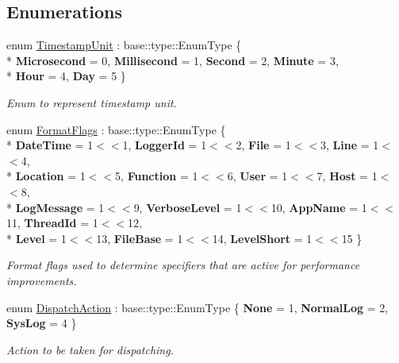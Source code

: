 \subsection*{Enumerations}
\begin{DoxyCompactItemize}
\item 
enum \hyperlink{namespaceel_1_1base_a1b886858c6409097395b24b1bdf03c39}{Timestamp\+Unit} \+: base\+::type\+::\+Enum\+Type \{ \\*
{\bfseries Microsecond} = 0, 
{\bfseries Millisecond} = 1, 
{\bfseries Second} = 2, 
{\bfseries Minute} = 3, 
\\*
{\bfseries Hour} = 4, 
{\bfseries Day} = 5
 \}\hypertarget{namespaceel_1_1base_a1b886858c6409097395b24b1bdf03c39}{}\label{namespaceel_1_1base_a1b886858c6409097395b24b1bdf03c39}
\begin{DoxyCompactList}\small\item\em Enum to represent timestamp unit. \end{DoxyCompactList}
\item 
enum \hyperlink{namespaceel_1_1base_a28939c5a884e67fcf12259f4b8848e00}{Format\+Flags} \+: base\+::type\+::\+Enum\+Type \{ \\*
{\bfseries Date\+Time} = 1$<$$<$1, 
{\bfseries Logger\+Id} = 1$<$$<$2, 
{\bfseries File} = 1$<$$<$3, 
{\bfseries Line} = 1$<$$<$4, 
\\*
{\bfseries Location} = 1$<$$<$5, 
{\bfseries Function} = 1$<$$<$6, 
{\bfseries User} = 1$<$$<$7, 
{\bfseries Host} = 1$<$$<$8, 
\\*
{\bfseries Log\+Message} = 1$<$$<$9, 
{\bfseries Verbose\+Level} = 1$<$$<$10, 
{\bfseries App\+Name} = 1$<$$<$11, 
{\bfseries Thread\+Id} = 1$<$$<$12, 
\\*
{\bfseries Level} = 1$<$$<$13, 
{\bfseries File\+Base} = 1$<$$<$14, 
{\bfseries Level\+Short} = 1$<$$<$15
 \}\hypertarget{namespaceel_1_1base_a28939c5a884e67fcf12259f4b8848e00}{}\label{namespaceel_1_1base_a28939c5a884e67fcf12259f4b8848e00}
\begin{DoxyCompactList}\small\item\em Format flags used to determine specifiers that are active for performance improvements. \end{DoxyCompactList}
\item 
enum \hyperlink{namespaceel_1_1base_a3aa2563d38e47388ba242a1694fc2839}{Dispatch\+Action} \+: base\+::type\+::\+Enum\+Type \{ {\bfseries None} = 1, 
{\bfseries Normal\+Log} = 2, 
{\bfseries Sys\+Log} = 4
 \}\hypertarget{namespaceel_1_1base_a3aa2563d38e47388ba242a1694fc2839}{}\label{namespaceel_1_1base_a3aa2563d38e47388ba242a1694fc2839}
\begin{DoxyCompactList}\small\item\em Action to be taken for dispatching. \end{DoxyCompactList}
\end{DoxyCompactItemize}
